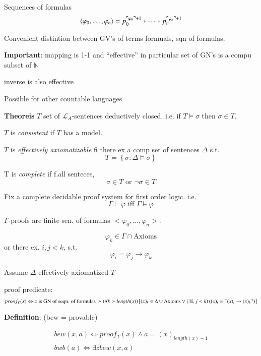 \documentclass[12pt]{article}
\newcommand{\Nat}{\ensuremath{\mathbb{N}}}
\newcommand{\defn}{\textbf{Definition}: }
\begin{document}
Sequences of formulas
\[
 \langle \varphi_0, \dots, \varphi_n \rangle 
 = p_0^{\ulcorner \varphi_0 \urcorner + 1} * \dots * p_n^{\ulcorner \varphi_n \urcorner + 1}
\]

Convenient distintion between GV's of terms formuals, sqn of formulas.

\textbf{Important}: mapping is 1-1 and ``effective''
in particular set of GN's is a compu subset of $\Nat$

inverse is also effective

Possible for other countable languages


\textbf{Theoreis}
$T$ set of $\mathcal{L}_A$-sentences deductively closed.  
i.e. if $T \models \sigma$ then $\sigma \in T$.


$T$ is \emph{consistent} if $T$ has a model.

$T$ is \emph{effectively axiomatizable} fi there ex a comp set of sentences 
$\Delta$ s.t.
\[
T = \left\{\sigma : \Delta \models \sigma \right\}
\]

T is \emph{complete} if f.all senteces,
\[
\sigma \in T \text{ or } \neg \sigma \in T
\]

Fix a complete decidable proof system for first order logic.
i.e.
\newcommand{\proves}{\vdash}
\[
\Gamma \proves \varphi \text{ iff } \Gamma \models \varphi
\]

$\Gamma$-proofs are finite sen. of formulas $<\varphi_0, \dots, \varphi_n >$.

\[
\varphi_k \in \Gamma \cap \text{Axioms}
\]
or there ex. $i,j < k$, s.t.
\[
\varphi_i = \varphi_j \rightarrow \varphi_k
\]

Assume $\Delta$ effectively axiomatized $T$

proof predicate:
\begin{align*}
  proof_T(x) \Leftrightarrow x \text{ is GN of seqn. of formulas }
  \wedge (\forall k > length(x) )
  \left[ (x)_k \in \Delta \cup \text{Axioms} \vee (\exists i,j < k) \left( (x)_i = \ulcorner (x)_i \rightarrow (x)_k \urcorner\right) \right]
\end{align*}

\defn
(bew = provable)

\begin{align*}
  bew(x,a) \Leftrightarrow proof_T(x) \wedge a =  (x)_{length(x)-1} \\
  bwb(a) \Leftrightarrow \exists z bew(x,a)
\end{align*}
\end{document}
